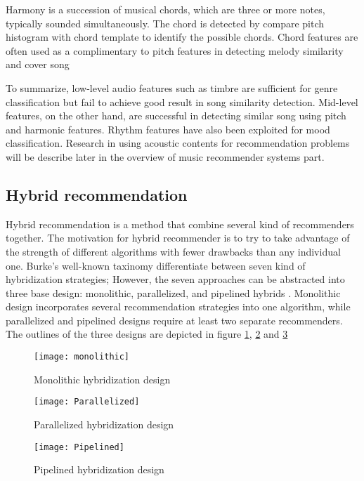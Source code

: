 Harmony is a succession of musical chords, which are three or more notes, typically sounded simultaneously. The chord is detected by compare pitch histogram with chord template to identify the possible chords. Chord features are often used as a complimentary to pitch features in detecting melody similarity and cover song \cite{ellis2007identifyingcover} \cite{bello2007audio}

To summarize, low-level audio features such as timbre are sufficient for genre classification but fail to achieve good result in song similarity detection. Mid-level features, on the other hand, are successful in detecting similar song using pitch and harmonic features. Rhythm features have also been exploited for mood classification. Research in using acoustic contents for recommendation problems will be describe later in the overview of music recommender systems part. 

\subsection{Hybrid recommendation}
Hybrid recommendation is a method that combine several kind of recommenders together. The motivation for hybrid recommender is to try to take advantage of the strength of different algorithms with fewer drawbacks than any individual one. Burke's well-known taxinomy \cite{burke2002hybrid} differentiate between seven kind of hybridization strategies; However, the seven approaches can be abstracted into three base design: monolithic, parallelized, and pipelined hybrids \cite{jannach2010recommender}. Monolithic design incorporates several recommendation strategies into one algorithm, while parallelized and pipelined designs require at least two separate recommenders. The outlines of the three designs are depicted in figure \ref{fig:monolithic}, \ref{fig:parallelized} and \ref{fig:pipelined}

\begin{figure}[h]
\texttt{[image: monolithic]}
\centering
\caption{Monolithic hybridization design}
\label{fig:monolithic}

\end{figure}

\begin{figure}[h]
\texttt{[image: Parallelized]}
\centering
\caption{Parallelized hybridization design}
\label{fig:parallelized}
\end{figure}

\begin{figure}[h]
\texttt{[image: Pipelined]}
\centering
\caption{Pipelined hybridization design}
\label{fig:pipelined}
\end{figure}

